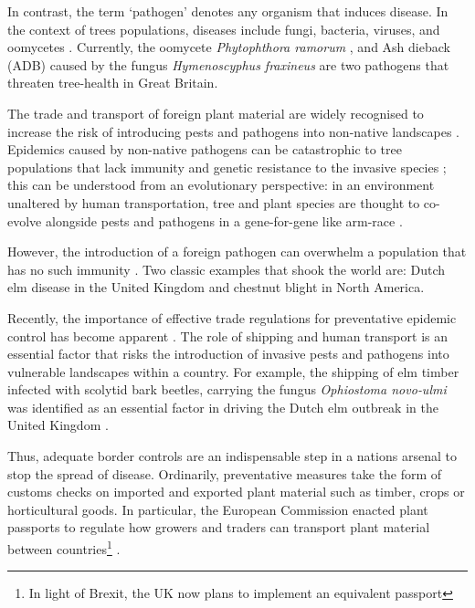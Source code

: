 In contrast, the term `pathogen' denotes any organism that induces disease. 
In the context of trees populations, diseases include fungi, bacteria, viruses, and oomycetes \cite{balloux2017q, Boyd1235773}. 
Currently, the oomycete \textit{Phytophthora ramorum} \cite{brasier2005phytophthora}, and Ash dieback (ADB)
caused by the fungus \textit{Hymenoscyphus fraxineus} \cite{ash-dieback-costs, mitchell2014ash} are two pathogens
that threaten tree-health in Great Britain.


The trade and transport of foreign plant material are widely recognised to increase the risk
of introducing pests and pathogens into non-native landscapes \cite{POTTER201761, lovett2016nonnative, roy2014increasing}.
Epidemics caused by non-native pathogens can be catastrophic to tree populations that lack immunity and genetic
resistance to the invasive species \cite{doi:10.1002/9781444329988.ch8}; this can be understood from an evolutionary perspective: 
in an environment unaltered by human transportation, tree and plant species are thought to co-evolve alongside pests and pathogens
in a gene-for-gene like arm-race \cite{flor1971current, dangl2001plant, Thrall1735}. 

However, the introduction of a foreign
pathogen can overwhelm a population that has no such immunity \cite{desprez2016evolutionary}. Two classic examples that shook
the world are: Dutch elm disease \cite{doi:10.1111/j.1365-3059.2010.02391.x} in the United Kingdom and chestnut blight
\cite{doi:10.1002/9780470535486.ch7} in North America.

Recently, the importance of effective trade regulations for preventative epidemic control has become apparent
\cite{rodoni2009role}. The role of shipping and human transport is an essential factor that risks the introduction
of invasive pests and pathogens into vulnerable landscapes within a country. For example, the shipping of elm timber
infected with scolytid bark beetles, carrying the fungus \textit{Ophiostoma novo‐ulmi} was identified as an essential
factor in driving the Dutch elm outbreak in the United Kingdom \cite{doi:10.1111/j.1365-3059.2010.02391.x}. 

Thus, adequate border controls are an indispensable step in a nations arsenal to stop the spread of disease.
Ordinarily, preventative measures take the form of customs checks on imported and exported plant material such
as timber, crops or horticultural goods. In particular, the European Commission enacted plant passports to regulate
how growers and traders can transport plant material between countries\footnote{In light of Brexit, the UK now plans
to implement an equivalent passport} \cite{wulfert2010implementation}.

